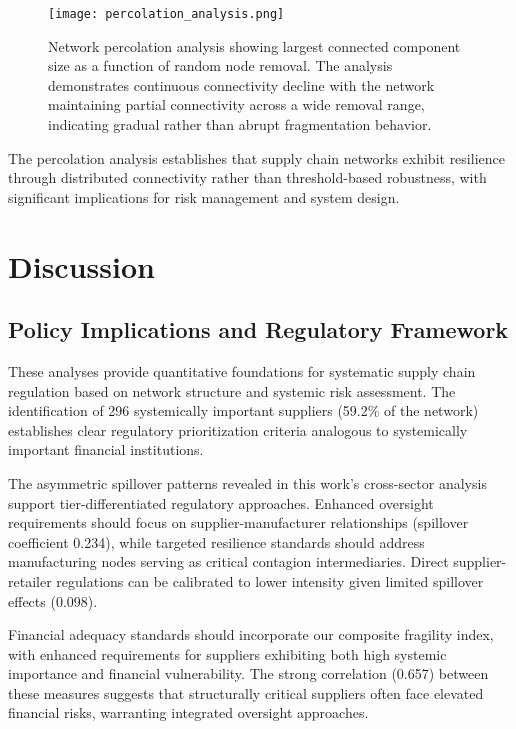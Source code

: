 \documentclass[a4 paper, 11pt,twoside]{article}
\newcommand{\0}{\Bf{0}}
\theoremstyle{definition}
\begin{document}
\begin{figure}[H]
\centering
\texttt{[image: percolation\_analysis.png]}
\caption{Network percolation analysis showing largest connected component size as a function of random node removal. The analysis demonstrates continuous connectivity decline with the network maintaining partial connectivity across a wide removal range, indicating gradual rather than abrupt fragmentation behavior.}
\end{figure}

The percolation analysis establishes that supply chain networks exhibit resilience through distributed connectivity rather than threshold-based robustness, with significant implications for risk management and system design.

\section{Discussion}

\subsection{Policy Implications and Regulatory Framework}

These analyses provide quantitative foundations for systematic supply chain regulation based on network structure and systemic risk assessment. The identification of 296 systemically important suppliers (59.2\% of the network) establishes clear regulatory prioritization criteria analogous to systemically important financial institutions.

The asymmetric spillover patterns revealed in this work's cross-sector analysis support tier-differentiated regulatory approaches. Enhanced oversight requirements should focus on supplier-manufacturer relationships (spillover coefficient 0.234), while targeted resilience standards should address manufacturing nodes serving as critical contagion intermediaries. Direct supplier-retailer regulations can be calibrated to lower intensity given limited spillover effects (0.098).

Financial adequacy standards should incorporate our composite fragility index, with enhanced requirements for suppliers exhibiting both high systemic importance and financial vulnerability. The strong correlation (0.657) between these measures suggests that structurally critical suppliers often face elevated financial risks, warranting integrated oversight approaches.
\end{document}
